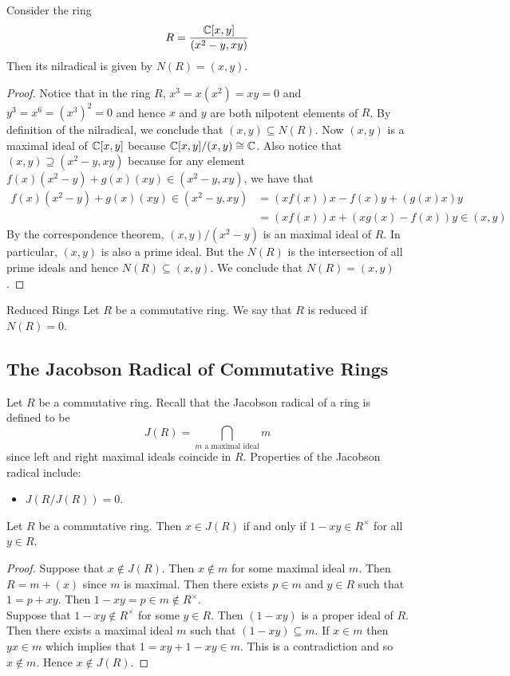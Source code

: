 \documentclass[a4paper]{article}
\begin{document}
\begin{eg}{}{} Consider the ring $$R=\frac{\mathbb{C}[x,y]}{(x^2-y,xy)}$$ Then its nilradical is given by $N(R)=(x,y)$. \tcbline
\begin{proof}
Notice that in the ring $R$, $x^3=x(x^2)=xy=0$ and $y^3=x^6=(x^3)^2=0$ and hence $x$ and $y$ are both nilpotent elements of $R$. By definition of the nilradical, we conclude that $(x,y)\subseteq N(R)$. Now $(x,y)$ is a maximal ideal of $\mathbb{C}[x,y]$ because $\mathbb{C}[x,y]/(x,y)\cong\mathbb{C}$. Also notice that $(x,y)\supseteq(x^2-y,xy)$ because for any element $f(x)(x^2-y)+g(x)(xy)\in(x^2-y,xy)$, we have that 
\begin{align*}
f(x)(x^2-y)+g(x)(xy)\in(x^2-y,xy)&=(xf(x))x-f(x)y+(g(x)x)y\\
&=(xf(x))x+(xg(x)-f(x))y\in (x,y)
\end{align*}
By the correspondence theorem, $(x,y)/(x^2-y)$ is an maximal ideal of $R$. In particular, $(x,y)$ is also a prime ideal. But the $N(R)$ is the intersection of all prime ideals and hence $N(R)\subseteq(x,y)$. We conclude that $N(R)=(x,y)$. 
\end{proof}
\end{eg}

\begin{defn}{Reduced Rings}{} Let $R$ be a commutative ring. We say that $R$ is reduced if $N(R)=0$. 
\end{defn}

\subsection{The Jacobson Radical of Commutative Rings}
Let $R$ be a commutative ring. Recall that the Jacobson radical of a ring is defined to be $$J(R)=\bigcap_{m\text{ a maximal ideal}}m$$ since left and right maximal ideals coincide in $R$. Properties of the Jacobson radical include: 
\begin{itemize}
\item $J(R/J(R))=0$. 
\end{itemize}

\begin{lmm}{}{} Let $R$ be a commutative ring. Then $x\in J(R)$ if and only if $1-xy\in R^\times$ for all $y\in R$. \tcbline
\begin{proof}
Suppose that $x\notin J(R)$. Then $x\notin m$ for some maximal ideal $m$. Then $R=m+(x)$ since $m$ is maximal. Then there exists $p\in m$ and $y\in R$ such that $1=p+xy$. Then $1-xy=p\in m\notin R^\times$. \\

Suppose that $1-xy\notin R^\times$ for some $y\in R$. Then $(1-xy)$ is a proper ideal of $R$. Then there exists a maximal ideal $m$ such that $(1-xy)\subseteq m$. If $x\in m$ then $yx\in m$ which implies that $1=xy+1-xy\in m$. This is a contradiction and so $x\notin m$. Hence $x\notin J(R)$. 
\end{proof}
\end{lmm}
\end{document}
